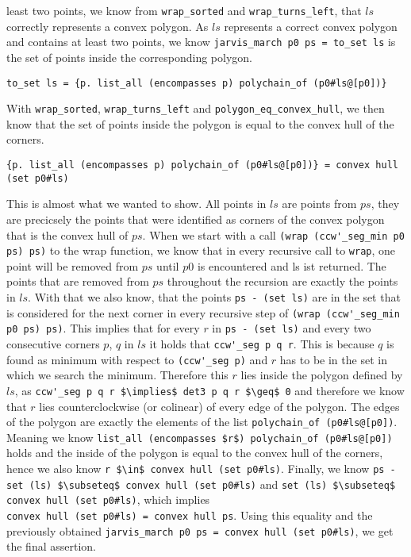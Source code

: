 least two points, we know from \lstinline|wrap_sorted| and \lstinline|wrap_turns_left|, that
$ls$ correctly represents a convex polygon. As $ls$ represents a correct convex polygon and 
contains at least two points, we know \lstinline|jarvis_march p0 ps = to_set ls|
is the set of points inside the corresponding polygon. 
\begin{lstlisting}
to_set ls = {p. list_all (encompasses p) polychain_of (p0#ls@[p0])}  
\end{lstlisting}
With \lstinline|wrap_sorted|, \lstinline|wrap_turns_left| and \lstinline|polygon_eq_convex_hull|,
we then know that the set of points inside the polygon is equal to the convex hull of the corners.
\begin{lstlisting}
{p. list_all (encompasses p) polychain_of (p0#ls@[p0])} = convex hull (set p0#ls) 
\end{lstlisting}
This is almost what we wanted to show.
All points in $ls$ are points from $ps$, they are precicsely the points that were identified as
corners of the convex polygon that is the convex hull of $ps$. When we start with 
a call \lstinline|(wrap (ccw'_seg_min p0 ps) ps)| to the wrap function, we know
that in every recursive call to \lstinline|wrap|, one point will be removed from $ps$
until $p0$ is encountered and ls ist returned. The points that are removed from $ps$
throughout the recursion are exactly the points in $ls$. 
With that we also know, that the points \lstinline|ps - (set ls)| are in the set that 
is considered for the next corner in every recursive step of 
\lstinline|(wrap (ccw'_seg_min p0 ps) ps)|. This implies that 
for every $r$ in \lstinline|ps - (set ls)| and every two consecutive corners 
$p$, $q$ in $ls$ it holds that \lstinline|ccw'_seg p q r|. This is because $q$ is found 
as minimum with respect to \lstinline|(ccw'_seg p)| and $r$ has to be in the set 
in which we search the minimum.  Therefore this $r$ 
lies inside the polygon defined by $ls$, as \lstinline|ccw'_seg p q r $\implies$ det3 p q r $\geq$ 0|
and therefore we know that $r$ lies counterclockwise (or colinear) of 
every edge of the polygon. The edges of the polygon are exactly the elements of 
the list \lstinline|polychain_of (p0#ls@[p0])|.  
Meaning we know \lstinline|list_all (encompasses $r$) polychain_of (p0#ls@[p0])|
holds
and the inside of the polygon is
equal to the convex hull of the corners, hence we also know 
\lstinline|r $\in$ convex hull (set p0#ls)|. Finally, we know 
\lstinline|ps - set (ls) $\subseteq$ convex hull (set p0#ls)| and 
\lstinline|set (ls) $\subseteq$ convex hull (set p0#ls)|, which implies \\
\lstinline|convex hull (set p0#ls) = convex hull ps|. Using this equality 
and the previously obtained \lstinline|jarvis_march p0 ps = convex hull (set p0#ls)|, 
we get the final assertion.
